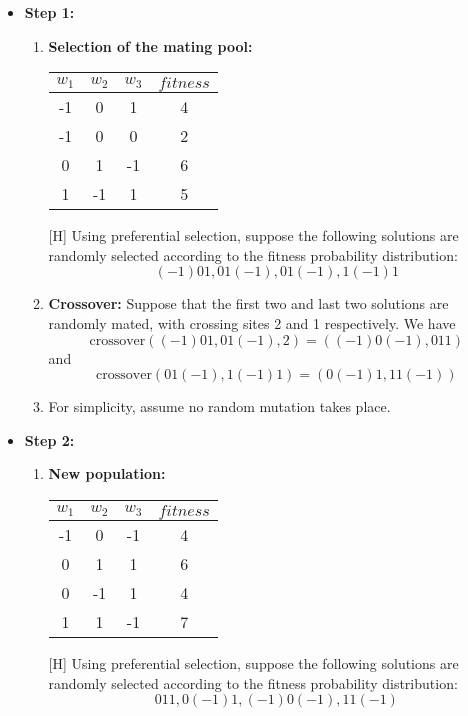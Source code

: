 \documentclass[12pt]{article}
\begin{document}
\begin{Q}
\begin{itemize}
\item \textbf{Step 1:}
\begin{enumerate}
    \item \textbf{Selection of the mating pool:}
    \begin{table}[H]\centering
    \begin{tabular}{ccc|c}
        $w_1$ & $w_2$ & $w_3$ & $fitness$ \\ \hline
        -1 & 0 & 1 & 4 \\
        -1 & 0 & 0 & 2 \\
        0 & 1 & -1 & 6 \\
        1 & -1 & 1 & 5
    \end{tabular}
    \end{table}[H]
    Using preferential selection, suppose the following solutions are randomly selected according to the fitness probability distribution:
    \[
        (-1)01, 01(-1), 01(-1), 1(-1)1
    \]

    \item \textbf{Crossover:} Suppose that the first two and last two solutions are randomly mated, with crossing sites 2 and 1 respectively. We have
    \[
        \text{crossover}((-1)01, 01(-1), 2) = ((-1)0(-1), 011)
    \]
    and
    \[
        \text{crossover}(01(-1), 1(-1)1) = (0(-1)1, 11(-1))
    \]

    \item For simplicity, assume no random mutation takes place.
\end{enumerate}

\item \textbf{Step 2:}
\begin{enumerate}
    \item \textbf{New population:}
    \begin{table}[H]\centering
    \begin{tabular}{ccc|c}
        $w_1$ & $w_2$ & $w_3$ & $fitness$ \\ \hline
        -1 & 0 & -1 & 4 \\
        0 & 1 & 1 & 6 \\
        0 & -1 & 1 & 4 \\
        1 & 1 & -1 & 7
    \end{tabular}
    \end{table}[H]
    Using preferential selection, suppose the following solutions are randomly selected according to the fitness probability distribution:
    \[
        011, 0(-1)1, (-1)0(-1), 11(-1)
    \]


\end{enumerate}
\end{itemize}
\end{Q}
\end{document}

